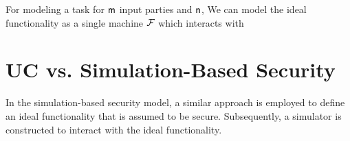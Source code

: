 For modeling a task for $\mathsf{m}$ input parties and $\mathsf{n}$, We can model the ideal functionality as a single machine $\mathcal{F}$ which interacts with 

\section{UC vs. Simulation-Based Security}

In the simulation-based security model, a similar approach is employed to define an ideal functionality that is assumed to be secure. Subsequently, a simulator is constructed to interact with the ideal functionality.






